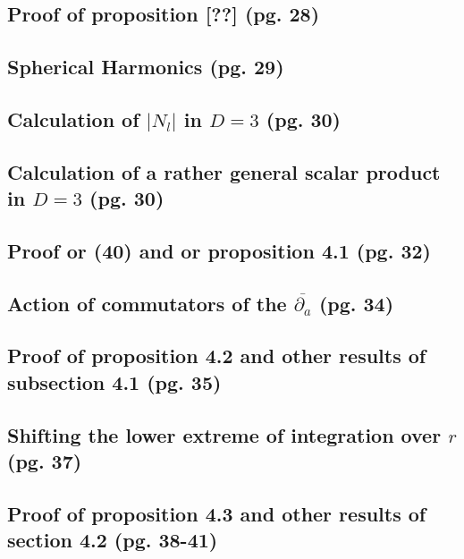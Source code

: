 \documentclass{article}
\begin{document}
\subsection{Proof of proposition [??] (pg. 28)}

\subsection{Spherical Harmonics (pg. 29)}

\subsection{Calculation of $|N_l|$ in $D = 3$ (pg. 30)}

\subsection{Calculation of a rather general scalar product in $D = 3$ (pg. 30)}

\subsection{Proof or (40) and or proposition 4.1 (pg. 32)}

\subsection{Action of commutators of the $\overline{\partial_a}$ (pg. 34)}

\subsection{Proof of proposition 4.2 and other results of subsection 4.1 (pg. 35)}

\subsection{Shifting the lower extreme of integration over $r$ (pg. 37)}

\subsection{Proof of proposition 4.3 and other results of section 4.2 (pg. 38-41)}
\end{document}
